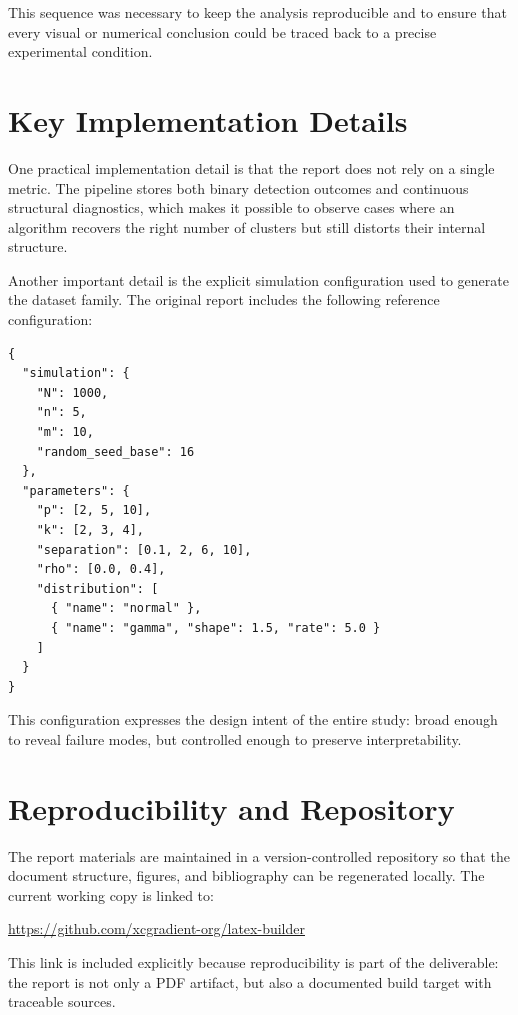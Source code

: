 This sequence was necessary to keep the analysis reproducible and to ensure that every visual or numerical conclusion could be traced back to a precise experimental condition.

\section{Key Implementation Details}
\label{sec:key-implementation-details}

One practical implementation detail is that the report does not rely on a single metric. The pipeline stores both binary detection outcomes and continuous structural diagnostics, which makes it possible to observe cases where an algorithm recovers the right number of clusters but still distorts their internal structure.

Another important detail is the explicit simulation configuration used to generate the dataset family. The original report includes the following reference configuration:

\begin{verbatim}
{
  "simulation": {
    "N": 1000,
    "n": 5,
    "m": 10,
    "random_seed_base": 16
  },
  "parameters": {
    "p": [2, 5, 10],
    "k": [2, 3, 4],
    "separation": [0.1, 2, 6, 10],
    "rho": [0.0, 0.4],
    "distribution": [
      { "name": "normal" },
      { "name": "gamma", "shape": 1.5, "rate": 5.0 }
    ]
  }
}
\end{verbatim}

This configuration expresses the design intent of the entire study: broad enough to reveal failure modes, but controlled enough to preserve interpretability.

\section{Reproducibility and Repository}
\label{sec:reproducibility-repository}

The report materials are maintained in a version-controlled repository so that the document structure, figures, and bibliography can be regenerated locally. The current working copy is linked to:
\begin{center}
  \url{https://github.com/xcgradient-org/latex-builder}
\end{center}

This link is included explicitly because reproducibility is part of the deliverable: the report is not only a PDF artifact, but also a documented build target with traceable sources.
